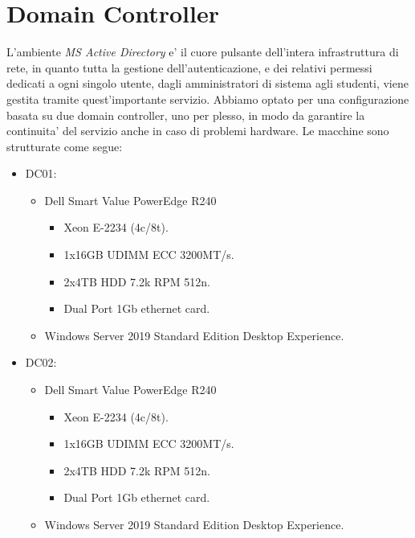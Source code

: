 \documentclass{report}
\begin{document}
        \section{Domain Controller}
        L'ambiente \emph{MS Active Directory} e' il cuore pulsante dell'intera infrastruttura di rete, in quanto tutta 
         la gestione dell'autenticazione, e dei relativi permessi dedicati a ogni singolo utente, dagli amministratori
         di sistema agli studenti, viene gestita tramite quest'importante servizio.
        Abbiamo optato per una configurazione basata su due domain controller, uno per plesso, in modo da garantire la
         continuita' del servizio anche in caso di problemi hardware.
        Le macchine sono strutturate come segue:
        \begin{itemize}
        \item DC01:
            \begin{itemize}
            \item Dell Smart Value PowerEdge R240
                \begin{itemize}
                    \item Xeon E-2234 (4c/8t).
                    \item 1x16GB UDIMM ECC 3200MT/s.
                    \item 2x4TB HDD 7.2k RPM 512n.
                    \item Dual Port 1Gb ethernet card.
                \end{itemize}
            \item Windows Server 2019 Standard Edition Desktop Experience.
            \end{itemize}\newpage
        \item DC02: 
            \begin{itemize}
            \item Dell Smart Value PowerEdge R240
                \begin{itemize}
                    \item Xeon E-2234 (4c/8t).
                    \item 1x16GB UDIMM ECC 3200MT/s.
                    \item 2x4TB HDD 7.2k RPM 512n.
                    \item Dual Port 1Gb ethernet card.
                \end{itemize}
            \item Windows Server 2019 Standard Edition Desktop Experience.
            \end{itemize}
        \end{itemize}
\end{document}
